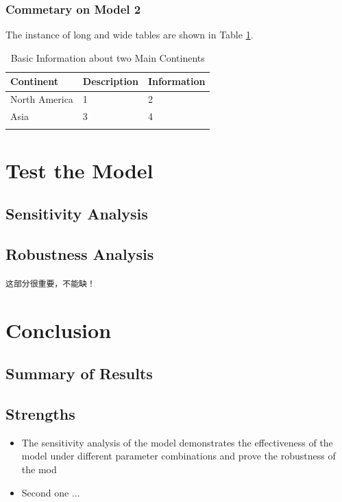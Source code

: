 \documentclass[12pt]{ctexart}
\begin{document}
\clearpage
\subsubsection{Commetary on Model 2}
The instance of long and wide tables are shown in Table \ref{tb:longtable}.

\begin{longtable}{ p{4em} p{14em} p{14em} }
	\caption{Basic Information about two Main Continents}
	\label{tb:longtable}                                                                                                                      \\
	\toprule
	Continent
	& Description 
	& Information \\
	\midrule
	North America
	& 1
	& 2 \\
	\midrule
	Asia
	& 3
	& 4 \\                                                                                               \\
	\bottomrule
\end{longtable}


\section{Test the Model}
\subsection{Sensitivity  Analysis}
\subsection{Robustness Analysis}
\texttt{这部分很重要，不能缺！}

\section{Conclusion}
\subsection{Summary of Results}

\subsection{Strengths}%
\begin{itemize}
	\item The sensitivity analysis of the model demonstrates the effectiveness of the model under different parameter combinations and prove the robustness of the mod
	\item Second one ...
\end{itemize}
\end{document}
